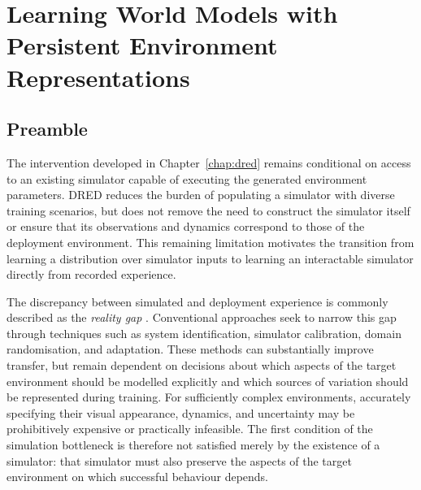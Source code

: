 \chapter{Learning World Models with Persistent Environment Representations}
\label{chap:persist}

\section{Preamble}

The intervention developed in Chapter~\ref{chap:dred} remains conditional on access to an existing simulator capable of executing the generated environment parameters. DRED reduces the burden of populating a simulator with diverse training scenarios, but does not remove the need to construct the simulator itself or ensure that its observations and dynamics correspond to those of the deployment environment. This remaining limitation motivates the transition from learning a distribution over simulator inputs to learning an interactable simulator directly from recorded experience.

The discrepancy between simulated and deployment experience is commonly described as the \emph{reality gap} \citep{jakobi1995noise,tobin2017domain}. Conventional approaches seek to narrow this gap through techniques such as system identification, simulator calibration, domain randomisation, and adaptation. These methods can substantially improve transfer, but remain dependent on decisions about which aspects of the target environment should be modelled explicitly and which sources of variation should be represented during training. For sufficiently complex environments, accurately specifying their visual appearance, dynamics, and uncertainty may be prohibitively expensive or practically infeasible. The first condition of the simulation bottleneck is therefore not satisfied merely by the existence of a simulator: that simulator must also preserve the aspects of the target environment on which successful behaviour depends.

